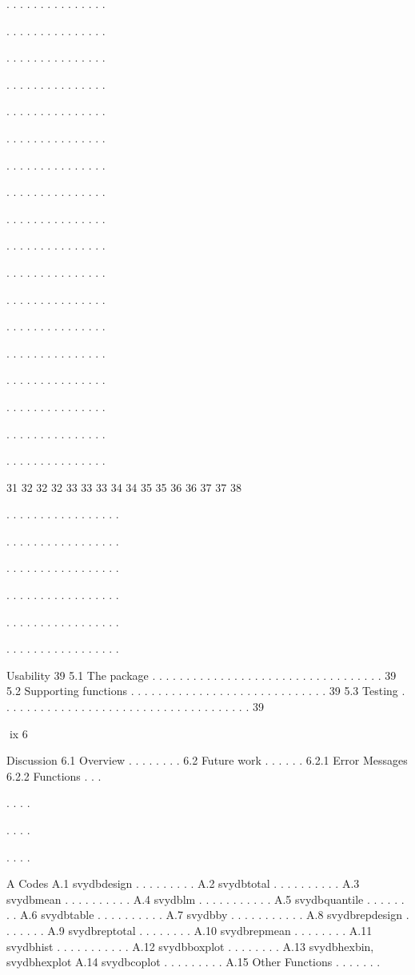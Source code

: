 .
.
.
.
.
.
.
.
.
.
.
.
.
.
.

.
.
.
.
.
.
.
.
.
.
.
.
.
.
.

.
.
.
.
.
.
.
.
.
.
.
.
.
.
.

.
.
.
.
.
.
.
.
.
.
.
.
.
.
.

.
.
.
.
.
.
.
.
.
.
.
.
.
.
.

.
.
.
.
.
.
.
.
.
.
.
.
.
.
.

.
.
.
.
.
.
.
.
.
.
.
.
.
.
.

.
.
.
.
.
.
.
.
.
.
.
.
.
.
.

.
.
.
.
.
.
.
.
.
.
.
.
.
.
.

.
.
.
.
.
.
.
.
.
.
.
.
.
.
.

.
.
.
.
.
.
.
.
.
.
.
.
.
.
.

.
.
.
.
.
.
.
.
.
.
.
.
.
.
.

.
.
.
.
.
.
.
.
.
.
.
.
.
.
.

.
.
.
.
.
.
.
.
.
.
.
.
.
.
.

.
.
.
.
.
.
.
.
.
.
.
.
.
.
.

.
.
.
.
.
.
.
.
.
.
.
.
.
.
.

.
.
.
.
.
.
.
.
.
.
.
.
.
.
.

.
.
.
.
.
.
.
.
.
.
.
.
.
.
.

31
32
32
32
33
33
33
34
34
35
35
36
36
37
37
38

.
.
.
.
.
.
.
.
.
.
.
.
.
.
.
.
.

.
.
.
.
.
.
.
.
.
.
.
.
.
.
.
.
.

.
.
.
.
.
.
.
.
.
.
.
.
.
.
.
.
.

.
.
.
.
.
.
.
.
.
.
.
.
.
.
.
.
.

.
.
.
.
.
.
.
.
.
.
.
.
.
.
.
.
.

.
.
.
.
.
.
.
.
.
.
.
.
.
.
.
.
.

Usability
39
5.1 The package . . . . . . . . . . . . . . . . . . . . . . . . . . . . . . . . . . 39
5.2 Supporting functions . . . . . . . . . . . . . . . . . . . . . . . . . . . . . 39
5.3 Testing . . . . . . . . . . . . . . . . . . . . . . . . . . . . . . . . . . . . . 39

ix
6

Discussion
6.1 Overview . . . . . . . .
6.2 Future work . . . . . .
6.2.1 Error Messages
6.2.2 Functions . . .

.
.
.
.

.
.
.
.

.
.
.
.

A Codes
A.1 svydbdesign . . . . . . . . .
A.2 svydbtotal . . . . . . . . . .
A.3 svydbmean . . . . . . . . . .
A.4 svydblm . . . . . . . . . . .
A.5 svydbquantile . . . . . . . .
A.6 svydbtable . . . . . . . . . .
A.7 svydbby . . . . . . . . . . .
A.8 svydbrepdesign . . . . . . .
A.9 svydbreptotal . . . . . . . .
A.10 svydbrepmean . . . . . . . .
A.11 svydbhist . . . . . . . . . . .
A.12 svydbboxplot . . . . . . . .
A.13 svydbhexbin, svydbhexplot
A.14 svydbcoplot . . . . . . . . .
A.15 Other Functions . . . . . . .

